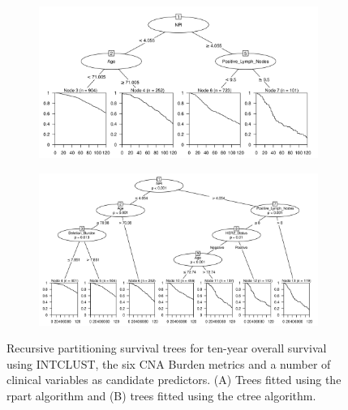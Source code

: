 \begin{figure}[!htb]
\centering

\vspace{1cm}

\begin{subfigure}{\textwidth}
\subcaption{}
\includegraphics[width=1\textwidth]{../figures/Appendices/Appendix_B/Clin_PartyKit_Survival_Burden_TenYearOS_INTCLUST.png}
\end{subfigure}

\vspace{2cm}

\begin{subfigure}{\textwidth}
\subcaption{}
\includegraphics[width=1\textwidth]{../figures/Appendices/Appendix_B/Clin_Ctree_Survival_Burden_TenYearOS_INTCLUST.png}
\end{subfigure}

\vspace{1cm}

\caption[Recursive partitioning survival trees for ten-year overall survival using INTCLUST, the six CNA Burden metrics and a number of clinical variables as candidate predictors.]{Recursive partitioning survival trees for ten-year overall survival using INTCLUST, the six CNA Burden metrics and a number of clinical variables as candidate predictors. (A) Trees fitted using the rpart algorithm and (B) trees fitted using the ctree algorithm.}
\end{figure}

